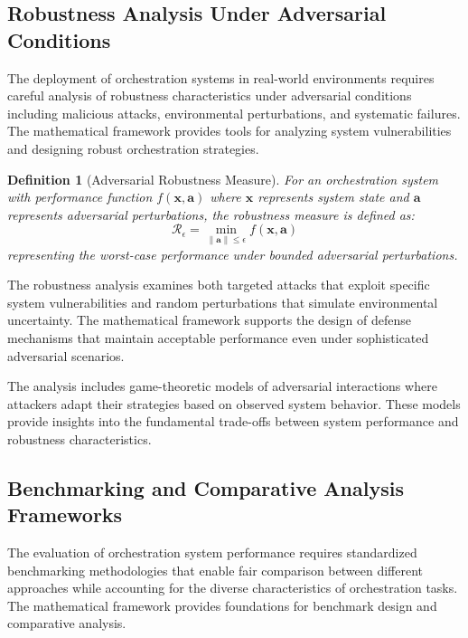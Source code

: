 \documentclass[12pt,a4paper]{article}
\newtheorem{definition}[theorem]{Definition}
\begin{document}
{{{\subsection{Robustness Analysis Under Adversarial Conditions}

The deployment of orchestration systems in real-world environments requires careful analysis of robustness characteristics under adversarial conditions including malicious attacks, environmental perturbations, and systematic failures. The mathematical framework provides tools for analyzing system vulnerabilities and designing robust orchestration strategies.

\begin{definition}[Adversarial Robustness Measure]
For an orchestration system with performance function $f(\mathbf{x}, \mathbf{a})$ where $\mathbf{x}$ represents system state and $\mathbf{a}$ represents adversarial perturbations, the robustness measure is defined as:
\begin{equation}
\mathcal{R}_{\epsilon} = \min_{\|\mathbf{a}\| \leq \epsilon} f(\mathbf{x}, \mathbf{a})
\end{equation}
representing the worst-case performance under bounded adversarial perturbations.
\end{definition}

The robustness analysis examines both targeted attacks that exploit specific system vulnerabilities and random perturbations that simulate environmental uncertainty. The mathematical framework supports the design of defense mechanisms that maintain acceptable performance even under sophisticated adversarial scenarios.

The analysis includes game-theoretic models of adversarial interactions where attackers adapt their strategies based on observed system behavior. These models provide insights into the fundamental trade-offs between system performance and robustness characteristics.

\subsection{Benchmarking and Comparative Analysis Frameworks}

The evaluation of orchestration system performance requires standardized benchmarking methodologies that enable fair comparison between different approaches while accounting for the diverse characteristics of orchestration tasks. The mathematical framework provides foundations for benchmark design and comparative analysis.

}}}
\end{document}
